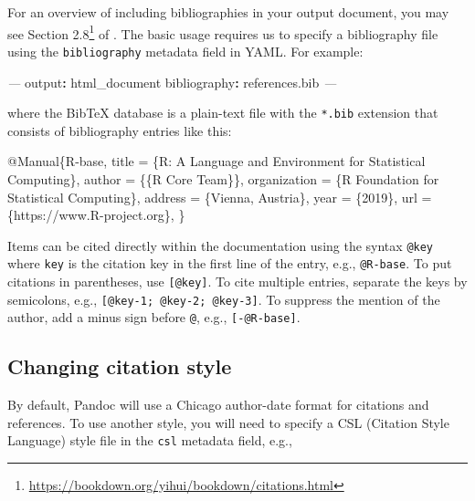 \documentclass[
  11pt,
]{krantz}
\newenvironment{Shaded}{\begin{snugshade}}{\end{snugshade}}
\newcommand{\AttributeTok}[1]{\textcolor[rgb]{0.61,0.61,0.61}{#1}}
\newcommand{\DataTypeTok}[1]{\textcolor[rgb]{0.27,0.27,0.27}{#1}}
\newcommand{\FunctionTok}[1]{\textcolor[rgb]{0,0,0}{#1}}
\newcommand{\KeywordTok}[1]{\textcolor[rgb]{0.27,0.27,0.27}{\textbf{#1}}}
\newcommand{\NormalTok}[1]{#1}
\newcommand{\OtherTok}[1]{\textcolor[rgb]{0.37,0.37,0.37}{#1}}
\newcommand{\PreprocessorTok}[1]{\textcolor[rgb]{0.37,0.37,0.37}{\textit{#1}}}
\newcommand{\VariableTok}[1]{\textcolor[rgb]{0,0,0}{#1}}
\renewcommand{\href}[2]{#2\footnote{\url{#1}}}
\begin{document}
For an overview of including bibliographies in your output document, you may see \href{https://bookdown.org/yihui/bookdown/citations.html}{Section 2.8} of \citet{bookdown2016}. The basic usage requires us to specify a bibliography file using the \texttt{bibliography} metadata field in YAML. For example:

\begin{Shaded}
\begin{Highlighting}[]
\PreprocessorTok{---}
\FunctionTok{output}\KeywordTok{:}\AttributeTok{ html_document}
\FunctionTok{bibliography}\KeywordTok{:}\AttributeTok{ references.bib  }
\PreprocessorTok{---}
\end{Highlighting}
\end{Shaded}

where the BibTeX database is a plain-text file with the \texttt{*.bib} extension that consists of bibliography entries like this:

\begin{Shaded}
\begin{Highlighting}[]
\VariableTok{@Manual}\NormalTok{\{}\OtherTok{R}\NormalTok{-}\OtherTok{base}\NormalTok{,}
  \DataTypeTok{title}\NormalTok{ = \{R: A Language and Environment for Statistical}
\NormalTok{           Computing\},}
  \DataTypeTok{author}\NormalTok{ = \{\{R Core Team\}\},}
  \DataTypeTok{organization}\NormalTok{ = \{R Foundation for Statistical Computing\},}
  \DataTypeTok{address}\NormalTok{ = \{Vienna, Austria\},}
  \DataTypeTok{year}\NormalTok{ = \{2019\},}
  \DataTypeTok{url}\NormalTok{ = \{https://www.R-project.org\},}
\NormalTok{\}}
\end{Highlighting}
\end{Shaded}

Items can be cited directly within the documentation using the syntax \texttt{@key} where \texttt{key} is the citation key in the first line of the entry, e.g., \texttt{@R-base}. To put citations in parentheses, use \texttt{{[}@key{]}}. To cite multiple entries, separate the keys by semicolons, e.g., \texttt{{[}@key-1;\ @key-2;\ @key-3{]}}. To suppress the mention of the author, add a minus sign before \texttt{@}, e.g., \texttt{{[}-@R-base{]}}.

\hypertarget{changing-citation-style}{%
\subsection{Changing citation style}\label{changing-citation-style}}

By default, Pandoc will use a Chicago author-date format for citations and references. To use another style, you will need to specify a CSL (Citation Style Language) style file in the \texttt{csl} metadata field, e.g.,
\end{document}
